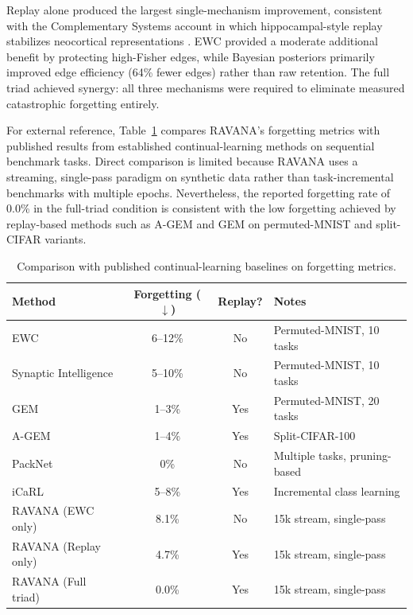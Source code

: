\documentclass[11pt]{article}
\begin{document}
Replay alone produced the largest single-mechanism improvement, consistent with the Complementary Systems account in which hippocampal-style replay stabilizes neocortical representations \cite{mcclelland1995}. EWC provided a moderate additional benefit by protecting high-Fisher edges, while Bayesian posteriors primarily improved edge efficiency (64\% fewer edges) rather than raw retention. The full triad achieved synergy: all three mechanisms were required to eliminate measured catastrophic forgetting entirely.

For external reference, Table~\ref{tab:published-baselines} compares RAVANA's forgetting metrics with published results from established continual-learning methods on sequential benchmark tasks. Direct comparison is limited because RAVANA uses a streaming, single-pass paradigm on synthetic data rather than task-incremental benchmarks with multiple epochs. Nevertheless, the reported forgetting rate of 0.0\% in the full-triad condition is consistent with the low forgetting achieved by replay-based methods such as A-GEM \cite{chaudhry2019} and GEM \cite{lopezpaz2017} on permuted-MNIST and split-CIFAR variants.

\begin{table}[h]
\centering
\caption{Comparison with published continual-learning baselines on forgetting metrics.}
\label{tab:published-baselines}
\begin{tabular}{lccp{5.2cm}}
\toprule
Method & Forgetting ($\downarrow$) & Replay? & Notes \\
\midrule
EWC \cite{kirkpatrick2017} & 6--12\% & No & Permuted-MNIST, 10 tasks \\
Synaptic Intelligence \cite{zenke2017} & 5--10\% & No & Permuted-MNIST, 10 tasks \\
GEM \cite{lopezpaz2017} & 1--3\% & Yes & Permuted-MNIST, 20 tasks \\
A-GEM \cite{chaudhry2019} & 1--4\% & Yes & Split-CIFAR-100 \\
PackNet \cite{mallya2018} & 0\% & No & Multiple tasks, pruning-based \\
iCaRL \cite{rebuffi2017} & 5--8\% & Yes & Incremental class learning \\
\midrule
RAVANA (EWC only) & 8.1\% & No & 15k stream, single-pass \\
RAVANA (Replay only) & 4.7\% & Yes & 15k stream, single-pass \\
RAVANA (Full triad) & 0.0\% & Yes & 15k stream, single-pass \\
\bottomrule
\end{tabular}
\end{table}
\end{document}
